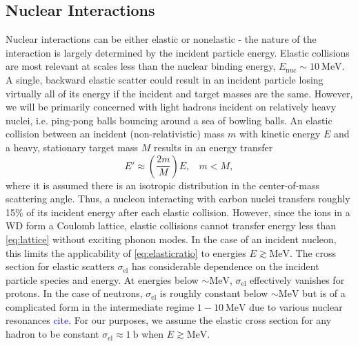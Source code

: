 \documentclass[twocolumn,showpacs,preprintnumbers,amsmath,amssymb,prd]{revtex4}
\def\r{\right)}
\def\l{\left(}
\begin{document}
\begin{appendices}
\subsection*{Nuclear Interactions}
Nuclear interactions can be either elastic or nonelastic - the nature of the interaction is largely determined by the incident particle energy.
Elastic collisions are most relevant at scales less than the nuclear binding energy, $E_\text{nuc} \sim 10 ~\text{MeV}$.
A single, backward elastic scatter could result in an incident particle losing virtually all of its energy if the incident and target masses are the same.
However, we will be primarily concerned with light hadrons incident on relatively heavy nuclei, i.e.
ping-pong balls bouncing around a sea of bowling balls.
An elastic collision between an incident (non-relativistic) mass $m$ with kinetic energy $E$ and a heavy, stationary target mass $M$ results in an energy transfer
\begin{equation}
\label{eq:elasticratio}
E' \approx \l \frac{2 m}{M}\r E, ~~~~ m < M,
\end{equation}
where it is assumed there is an isotropic distribution in the center-of-mass scattering angle.
Thus, a nucleon interacting with carbon nuclei transfers roughly 15\% of its incident energy after each elastic collision.
However, since the ions in a WD form a Coulomb lattice, elastic collisions cannot transfer energy less than \eqref{eq:lattice} without exciting phonon modes.
In the case of an incident nucleon, this limits the applicability of \eqref{eq:elasticratio} to energies $E \gtrsim \text{MeV}$.
The cross section for elastic scatters $\sigma_\text{el}$ has considerable dependence on the incident particle species and energy.
At energies below $\sim \text{MeV}$, $\sigma_\text{el}$ effectively vanishes for protons.
In the case of neutrons, $\sigma_\text{el}$ is roughly constant below $\sim \text{MeV}$ but is of a complicated form in the intermediate regime $1 - 10 ~\text{MeV}$ due to various nuclear resonances \textcolor{blue}{cite}.
For our purposes, we assume the elastic cross section for any hadron to be constant $\sigma_\text{el} \approx 1 ~\text{b}$ when $E \gtrsim \text{MeV}$.


\end{appendices}
\end{document}
